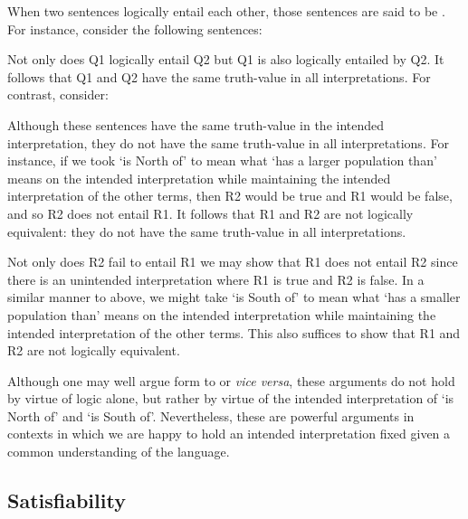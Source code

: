 When two sentences logically entail each other, those sentences are said to be .
For instance, consider the following sentences:

\begin{earg}
\end{earg}

Not only does Q1 logically entail Q2 but Q1 is also logically entailed by Q2.
It follows that Q1 and Q2 have the same truth-value in all interpretations.
For contrast, consider:

\begin{earg} \label{ch00:north}
\end{earg}

Although these sentences have the same truth-value in the intended interpretation, they do not have the same truth-value in all interpretations.
For instance, if we took `is North of' to mean what `has a larger population than' means on the intended interpretation while maintaining the intended interpretation of the other terms, then R2 would be true and R1 would be false, and so R2 does not entail R1.
It follows that R1 and R2 are not logically equivalent: they do not have the same truth-value in all interpretations.

Not only does R2 fail to entail R1 we may show that R1 does not entail R2 since there is an unintended interpretation where R1 is true and R2 is false.
In a similar manner to above, we might take `is South of' to mean what `has a smaller population than' means on the intended interpretation while maintaining the intended interpretation of the other terms.
This also suffices to show that R1 and R2 are not logically equivalent.

Although one may well argue form  to  or \textit{vice versa}, these arguments do not hold by virtue of logic alone, but rather by virtue of the intended interpretation of `is North of' and `is South of'.
Nevertheless, these are powerful arguments in contexts in which we are happy to hold an intended interpretation fixed given a common understanding of the language.



\subsection{Satisfiability}

